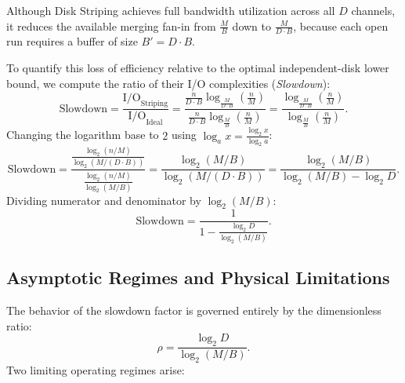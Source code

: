 Although Disk Striping achieves full bandwidth utilization across all $D$ channels, it reduces the available merging fan-in from $\frac{M}{B}$ down to $\frac{M}{D \cdot B}$, because each open run requires a buffer of size $B' = D \cdot B$.

To quantify this loss of efficiency relative to the optimal independent-disk lower bound, we compute the ratio of their I/O complexities (\textit{Slowdown}):
\begin{equation}
  \text{Slowdown} = \frac{\mathrm{I/O}_{\text{Striping}}}{\mathrm{I/O}_{\text{Ideal}}}
  = \frac{\displaystyle \frac{n}{D \cdot B} \log_{\frac{M}{D \cdot B}}\left(\frac{n}{M}\right)}{\displaystyle \frac{n}{D \cdot B} \log_{\frac{M}{B}}\left(\frac{n}{M}\right)}
  = \frac{\log_{\frac{M}{D \cdot B}}\left(\frac{n}{M}\right)}{\log_{\frac{M}{B}}\left(\frac{n}{M}\right)}.
\end{equation}
Changing the logarithm base to $2$ using $\log_a x = \frac{\log_2 x}{\log_2 a}$:
\begin{equation}
  \text{Slowdown} = \frac{\displaystyle \frac{\log_2(n / M)}{\log_2(M / (D \cdot B))}}{\displaystyle \frac{\log_2(n / M)}{\log_2(M / B)}}
  = \frac{\log_2(M / B)}{\log_2(M / (D \cdot B))}
  = \frac{\log_2(M / B)}{\log_2(M / B) - \log_2 D}.
\end{equation}
Dividing numerator and denominator by $\log_2(M / B)$:
\begin{equation}
  \text{Slowdown} = \frac{1}{\displaystyle 1 - \frac{\log_2 D}{\log_2(M / B)}}.
  \label{eq:slowdown-formula}
\end{equation}

\subsection{Asymptotic Regimes and Physical Limitations}
\label{subsec:striping-limits}

The behavior of the slowdown factor is governed entirely by the dimensionless ratio:
\begin{equation}
  \rho = \frac{\log_2 D}{\log_2(M / B)}.
\end{equation}
Two limiting operating regimes arise:

